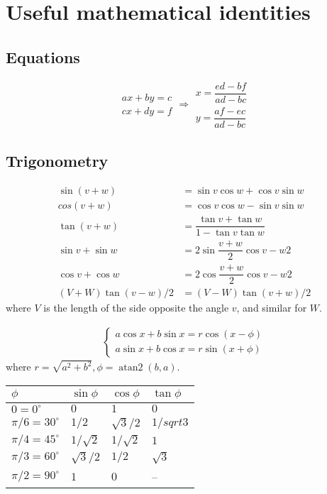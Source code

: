 
\chapter{Useful mathematical identities}

\section{Equations}
$$\begin{aligned}ax+by=c\\cx+dy=f\end{aligned}
\Rightarrow
\begin{aligned}x=\dfrac{ed-bf}{ad-bc}\\y=\dfrac{af-ec}{ad-bc}\end{aligned}$$

\section{Trigonometry}
\begin{align*}
\sin(v+w)&{}=\sin v\cos w+\cos v\sin w\\
cos(v+w)&{}=\cos v\cos w-\sin v\sin w\\
\tan(v+w)&{}=\dfrac{\tan v+\tan w}{1-\tan v\tan w}\\
\sin v+\sin w&{}=2\sin\dfrac{v+w}{2}\cos{v-w}{2}\\
\cos v+\cos w&{}=2\cos\dfrac{v+w}{2}\cos{v-w}{2}\\
(V+W)\tan(v-w)/2&{}=(V-W)\tan(v+w)/2
\end{align*}
where $V$ is the length of the side opposite the angle $v$, and
similar for $W$.

\begin{align*}
\begin{cases}
a\cos x+b\sin x=r\cos(x-\phi)\\
a\sin x+b\cos x=r\sin(x+\phi)
\end{cases}
\end{align*}
where $r=\sqrt{a^2+b^2}, \phi=\operatorname{atan2}(b,a)$.

\begin{center}
\begin{tabular}{|l|l|l|l|}
\hline
$\phi$ & $\sin\phi$ & $\cos\phi$ & $\tan\phi$ \\
\hline
$0 = 0^\circ$ & $0$ & $1$ & $0$\\
\hline
$\pi/6 = 30^\circ$ & $1/2$ & $\sqrt3/2$ & $1/sqrt3$\\
\hline
$\pi/4 = 45^\circ$ & $1/\sqrt2$ & $1/\sqrt2$ & $1$\\
\hline
$\pi/3 = 60^\circ$ & $\sqrt3/2$ & $1/2$ & $\sqrt3$\\
\hline
$\pi/2 = 90^\circ$ & $1$ & $0$ & --\\
\hline
\end{tabular}
\end{center}

